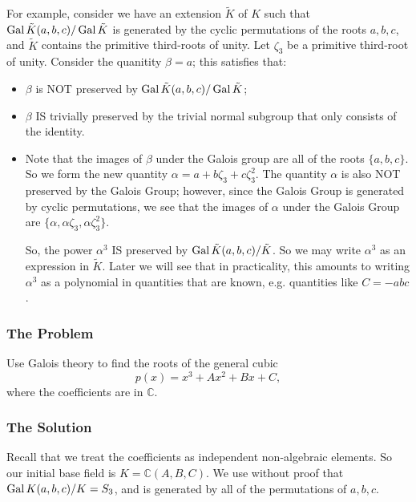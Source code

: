 \begin{itemize}
For example, consider we have an extension \(\tilde K\) of \(K\) such that 
\(\operatorname{Gal} \tilde K(a, b, c) / \operatorname{Gal} \tilde K\) is generated by the cyclic permutations of the roots
\(a, b, c\), and \(\tilde K\) contains the primitive third-roots of unity. Let \(\zeta_3\) be a
primitive third-root of unity. Consider the quanitity \(\beta = a\); this satisfies that: 
    \begin{itemize}
    \item \(\beta\) is NOT preserved by \(\operatorname{Gal} \tilde K(a, b, c) / \operatorname{Gal} \tilde K\); 
    \item \(\beta\) IS trivially preserved by the trivial normal subgroup that only consists
    of the identity.
    \item Note that the images of \(\beta\) under the Galois group are all of the roots \(\{a, b, c\}\).
    So we form the new quantity \(\alpha = a + b\zeta_3 + c\zeta_3^2\). The quantity \(\alpha\) is
    also NOT preserved by the Galois Group; however, since the Galois Group is generated by cyclic
    permutations, we see that the images of \(\alpha\) under the Galois Group are 
    \(\{\alpha, \alpha \zeta_3, \alpha \zeta_3^2\}\). 

    So, the power \(\alpha^3\) IS preserved by \(\operatorname{Gal} \tilde K(a, b, c) / \tilde K\). So we
    may write \(\alpha^3\) as an expression in \(\tilde K\). Later we will see that in practicality,
    this amounts to writing \(\alpha^3\) as a polynomial in quantities that are known, e.g. quantities
    like \(C = -abc\).
    \end{itemize} 
\end{itemize}

\subsubsection*{The Problem}

Use Galois theory to find the roots of the general cubic
\begin{equation}
p(x) = x^3 + Ax^2 + Bx + C,
\end{equation}
where the coefficients are in \(\mathbb C\).

\subsubsection*{The Solution}

Recall that we treat the coefficients as independent non-algebraic elements. So our initial base field is
\(K = \mathbb C(A, B, C)\). We use without proof that \(\operatorname{Gal} K(a, b, c) / K = S_3\), and is generated by
all of the permutations of \(a, b, c\).

